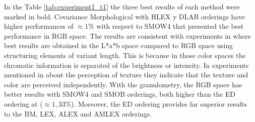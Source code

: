 \begin{table}
\begin{tabular}{@{}lrr@{}}
\end{tabular}
\label{exper_ordenaciones}
\end{table}
In the Table \ref{tab:experiment1_t1} the three best results of each method were marked in bold. Covariance Morphological with HLEX y DLAB orderings have higher performances of $\approx 1\%$ with respect to SMOW4 that presented the best performance in RGB space. The results are consistent with experiments in \cite{hanbury2005illumination} where best results are obtained in the L*a*b space compared to RGB space using structuring elements of variant length. This is because in those color spaces the chromatic information is separated of the brightness or intensity. 
In experiments mentioned in \cite{bianconi2011theoretical} about the perception of texture they indicate that the texture and color are perceived independently. 
With the granulometry, the RGB space has better results with SMOW4 and SMOB orderings, both higher than the ED ordering at ($\approx 1,33 \% $). Moreover, the ED ordering provides far superior results to the BM, LEX, ALEX and AMLEX orderings.

